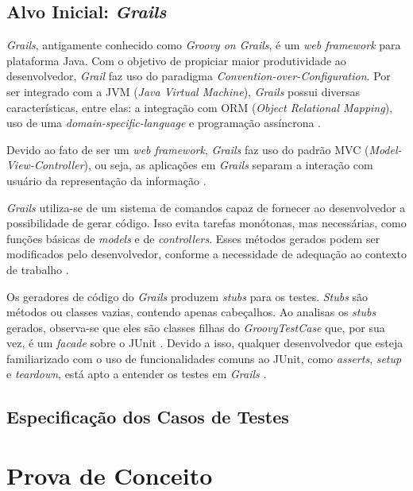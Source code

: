 \subsection{Alvo Inicial: \textit{Grails}} 
\textit{Grails}, antigamente conhecido como \textit{Groovy on Grails}, é um \textit{web framework} para plataforma Java. Com o objetivo de propiciar maior produtividade ao desenvolvedor, \textit{Grail} faz uso do paradigma \textit{Convention-over-Configuration}.  Por ser integrado com a JVM (\textit{Java Virtual Machine}), \textit{Grails} possui diversas características, entre elas: a integração com ORM (\textit{Object Relational Mapping}), uso de uma \textit{domain-specific-language} e programação assíncrona \cite{grails2015}.
\par
\indent Devido ao fato de ser um \textit{web framework}, \textit{Grails} faz uso do padrão MVC (\textit{Model-View-Controller}), ou seja, as aplicações em \textit{Grails} separam a interação com usuário da representação da informação \cite{grails2015}.
\par
\indent \textit{Grails} utiliza-se de um sistema de comandos capaz de fornecer ao desenvolvedor a possibilidade de gerar código. Isso evita tarefas monótonas, mas necessárias, como funções básicas de \textit{models} e de \textit{controllers}. Esses métodos gerados podem ser modificados pelo desenvolvedor, conforme a necessidade de adequação ao contexto de trabalho  \cite{grails2015}.
\par
\indent Os geradores de código do \textit{Grails} produzem  \textit{stubs} para os testes. \textit{Stubs} são métodos ou classes vazias, contendo apenas cabeçalhos. Ao analisas os \textit{stubs} gerados, observa-se que eles são classes filhas do \textit{GroovyTestCase} que, por sua vez, é um \textit{facade} sobre o JUnit \cite{broughton2010}. Devido a isso, qualquer desenvolvedor que esteja familiarizado com o uso de funcionalidades comuns ao JUnit, como \textit{asserts}, \textit{setup} e \textit{teardown}, está apto a entender os testes em \textit{Grails} \cite{broughton2010}.   	
 
\subsection{Especificação dos Casos de Testes}

\section{Prova de Conceito}

